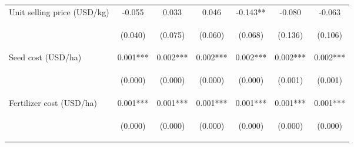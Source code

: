 \begin{center}
\begin{tabular}{lcccccc}
Unit selling price (USD/kg) & -0.055 & 0.033 & 0.046 & -0.143** & -0.080 & -0.063 \\
\vspace{4pt} & \begin{footnotesize}(0.040)\end{footnotesize} & \begin{footnotesize}(0.075)\end{footnotesize} & \begin{footnotesize}(0.060)\end{footnotesize} & \begin{footnotesize}(0.068)\end{footnotesize} & \begin{footnotesize}(0.136)\end{footnotesize} & \begin{footnotesize}(0.106)\end{footnotesize} \\
Seed cost (USD/ha) & 0.001*** & 0.002*** & 0.002*** & 0.002*** & 0.002*** & 0.002*** \\
\vspace{4pt} & \begin{footnotesize}(0.000)\end{footnotesize} & \begin{footnotesize}(0.000)\end{footnotesize} & \begin{footnotesize}(0.000)\end{footnotesize} & \begin{footnotesize}(0.000)\end{footnotesize} & \begin{footnotesize}(0.001)\end{footnotesize} & \begin{footnotesize}(0.001)\end{footnotesize} \\
Fertilizer cost (USD/ha) & 0.001*** & 0.001*** & 0.001*** & 0.001*** & 0.001*** & 0.001*** \\
\vspace{4pt} & \begin{footnotesize}(0.000)\end{footnotesize} & \begin{footnotesize}(0.000)\end{footnotesize} & \begin{footnotesize}(0.000)\end{footnotesize} & \begin{footnotesize}(0.000)\end{footnotesize} & \begin{footnotesize}(0.000)\end{footnotesize} & \begin{footnotesize}(0.000)\end{footnotesize} \\

\end{tabular}
\end{center}
